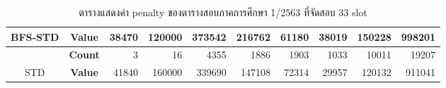\begin{table}[]
{\begin{tabular}{@{}ccrrrrrrrr@{}}
    \multirow{-2}{*}{BFS-STD}                    & \textbf{Value}                        & 38470                          & 120000                         & 373542                         & 216762                         & 61180                          & 38019                          & 150228                         & 998201                           \\ \midrule
                                                  & {\textbf{Count}} & {3}       & {16}      & {4355}    & {1886}    & {1903}    & {1033}    & {10011}   & {19207}     \\ \cmidrule(l){2-10} 
    \multirow{-2}{*}{STD} & {\textbf{Value}} & {41840}   & {160000}  & {339690}  & {147108}  & {72314}   & {29957}   & {120132}  & {911041}    \\ \bottomrule
    \end{tabular}%
    }
    \caption{ตารางแสดงค่า penalty ของตารางสอบภาคการศึกษา 1/2563 ที่จัดสอบ 33 slot}
    \label{tab:result_table_163_33}
\end{table}
